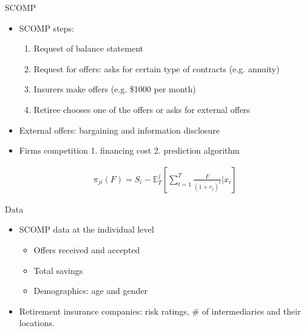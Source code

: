 \documentclass[10pt,aspectratio=169]{beamer}
\begin{document}
\begin{frame}{SCOMP} 
    \begin{itemize}%
    \item SCOMP steps: 
    \begin{enumerate}
        \item Request of balance statement 
        \item Request for offers: asks for certain type of contracts (e.g. annuity)
        \item Insurers make offers (e.g. \$1000 per month)
        \item Retiree chooses one of the offers or asks for external offers

    \end{enumerate}

        \item External offers: bargaining and information disclosure
    

    \item Firms competition 1. financing cost 2. prediction algorithm 

    \begin{align*}
    \pi_{ji}(F) = S_i-  \mathbb{E}^j_{T} \left[\sum_{t=1}^T\frac{F}{(1+r_j)^t}|x_i \right]
    \end{align*}
    \end{itemize}
\end{frame}


 \begin{frame}{Data}
\begin{itemize}
    \item SCOMP data at the individual level  
    \begin{itemize}
        \item Offers received and accepted 
        \item Total savings 
        \item Demographics: age and gender
    \end{itemize}
     \item Retirement insurance companies: risk ratings, \#  of intermediaries and their  locations.
\end{itemize}


\end{frame}
\end{document}
